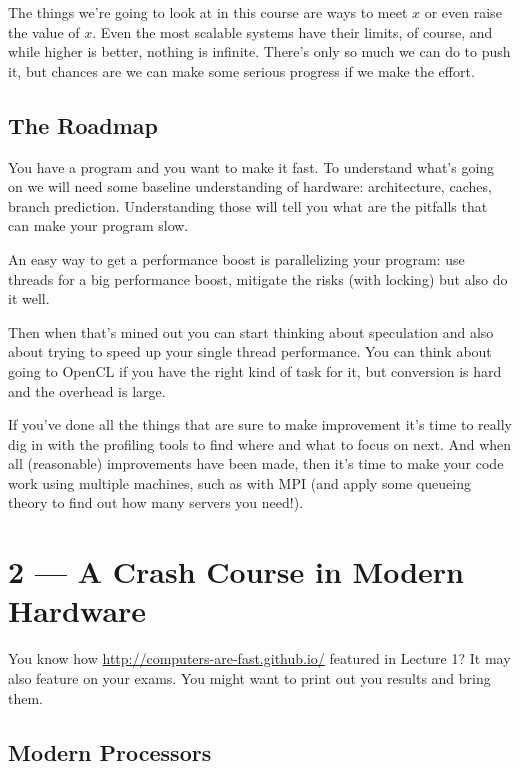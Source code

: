 \documentclass[a4paper]{report}
\begin{document}
The things we're going to look at in this course are ways to meet $x$ or even raise the value of $x$. Even the most scalable systems have their limits, of course, and while higher is better, nothing is infinite. There's only so much we can do to push it, but chances are we can make some serious progress if we make the effort.

\section*{The Roadmap}
You have a program and you want to make it fast. To understand what's going on we will need some baseline understanding of hardware: architecture, caches, branch prediction. Understanding those will tell you what are the pitfalls that can make your program slow.

An easy way to get a performance boost is parallelizing your program: use threads for a big performance boost, mitigate the risks (with locking) but also do it well. 

Then when that's mined out you can start thinking about speculation and also about trying to speed up your single thread performance. You can think about going to OpenCL if you have the right kind of task for it, but conversion is hard and the overhead is large. 

If you've done all the things that are sure to make improvement it's time to really dig in with the profiling tools to find where and what to focus on next. And when all (reasonable) improvements have been made, then it's time to make your code work using multiple machines, such as with MPI (and apply some queueing theory to find out how many servers you need!).









\chapter*{2 --- A Crash Course in Modern Hardware}


You know how \url{http://computers-are-fast.github.io/} featured in Lecture 1? It may also feature on your exams. You might want to print out you results and bring them.

\section*{Modern Processors}
\end{document}
